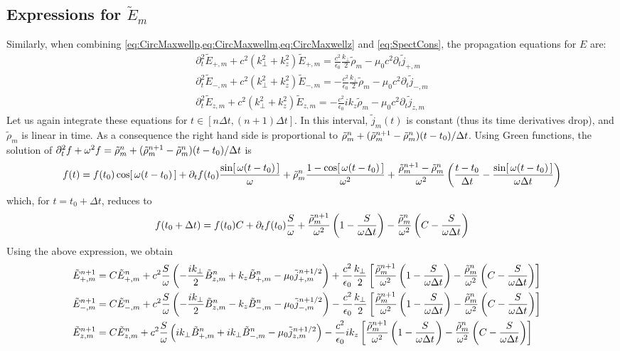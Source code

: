 \subsection{Expressions for $\tilde{E}_m$}

Similarly, when combining \cref{eq:CircMaxwellp,eq:CircMaxwellm,eq:CircMaxwellz}
and \cref{eq:SpectCons}, the propagation equations for $E$ are:
\begin{align*}
\partial_t^2 \tilde{E}_{+,m} + c^2(k_\perp^2 + k_z^2) \tilde{E}_{+,m}
= \frac{c^2}{\epsilon_0} \frac{k_\perp}{2} \tilde{\rho}_m -
\mu_0c^2 \partial_t\tilde{j}_{+,m} \\
\partial_t^2 \tilde{E}_{-,m} + c^2(k_\perp^2 + k_z^2) \tilde{E}_{-,m}
= - \frac{c^2}{\epsilon_0} \frac{k_\perp}{2} \tilde{\rho}_m -
\mu_0c^2 \partial_t\tilde{j}_{-,m} \\
\partial_t^2 \tilde{E}_{z,m} + c^2(k_\perp^2 + k_z^2) \tilde{E}_{z,m}
= - \frac{c^2}{\epsilon_0} i k_z \tilde{\rho}_m -
\mu_0c^2 \partial_t\tilde{j}_{z,m} 
\end{align*}
Let us again integrate these equations for $t\in [n\Delta t, (n+1)\Delta
t]$. In this interval, $\tilde{j}_m(t)$ is constant (thus its time
derivatives drop), and $\tilde{\rho}_m$ is linear in time. As a
consequence the right hand side is proportional to $\tilde{\rho}_{m}^{n} +
(\tilde{\rho}_{m}^{n+1}-\tilde{\rho}_{m}^{n})(t-t_0)/\Delta t$. Using Green functions, the solution of 
$ \partial_t^2 f + \omega^2 f = \tilde{\rho}_{m}^{n} + (\tilde{\rho}_{m}^{n+1}-\tilde{\rho}_{m}^{n})(t-t_0)/\Delta t $ is
\[ f(t) = f(t_0) \cos[\,\omega(t-t_0)\,] + \partial_tf (t_0)
\frac{\sin[\,\omega(t-t_0)\,]}{\omega} + \tilde{\rho}_{m}^{n}\frac{1-
  \cos[\,\omega(t-t_0)\,]}{\omega^2} + \frac{\tilde{\rho}_{m}^{n+1}-\tilde{\rho}_{m}^{n}}{\omega^2}\left(
  \frac{t-t_0}{\Delta t} - \frac{\sin[\,\omega(t-t_0)\,]}{\omega
    \Delta t}
\right) \]
which, for $t=t_0 +\Delta t$, reduces to
\[ f(t_0 +\Delta t) = f(t_0) C + \partial_tf (t_0)
\frac{S}{\omega} 
+ \frac{\tilde{\rho}_{m}^{n+1}}{\omega^2}\left( 1 - \frac{S}{\omega\Delta t}\right) 
- \frac{\tilde{\rho}_{m}^{n}}{\omega^2}\left( C - \frac{S}{\omega\Delta t}\right) \]
Using the above expression, we obtain
\begin{align*}
\tilde{E}_{+,m}^{n+1} = \; & C \tilde{E}_{+,m}^{n} + 
c^2\frac{S}{\omega}\left(-\frac{ik_\perp }{2} \tilde{B}_{z,m}^{n} + k_z\tilde{B}_{+,m}^{n}
- \mu_0 \tilde{j}_{+,m}^{n+1/2} \right) + \frac{c^2}{\epsilon_0}
\frac{k_\perp}{2}\left[ \frac{\tilde{\rho}_{m}^{n+1}}{\omega^2}\left(
  1 - \frac{S}{\omega\Delta t}\right) -
\frac{\tilde{\rho}_{m}^{n}}{\omega^2}\left( C -\frac{S}{\omega\Delta t}\right)\right]  & \\
\tilde{E}_{-,m}^{n+1} =\; & C \tilde{E}_{-,m}^{n} +
c^2\frac{S}{\omega}\left(- \frac{ik_\perp }{2} \tilde{B}_{z,m}^{n} - k_z\tilde{B}_{-,m}^{n}
- \mu_0 \tilde{j}_{-,m}^{n+1/2} \right) - \frac{c^2}{\epsilon_0}
\frac{k_\perp}{2}\left[ \frac{\tilde{\rho}_{m}^{n+1}}{\omega^2}\left(
  1 - \frac{S}{\omega\Delta t}\right) - \frac{\tilde{\rho}_{m}^{n}}{\omega^2}
\left( C - \frac{S}{\omega\Delta t}\right)\right]  &\\
\tilde{E}_{z,m}^{n+1} =\; & C \tilde{E}_{z,m}^{n} + 
c^2\frac{S}{\omega}\left(ik_\perp \tilde{B}_{+,m}^{n} + ik_\perp \tilde{B}_{-,m}^{n}
- \mu_0 \tilde{j}_{z,m}^{n+1/2} \right) - \frac{c^2}{\epsilon_0}
ik_z\left[ \frac{\tilde{\rho}_{m}^{n+1}}{\omega^2}\left(
  1 - \frac{S}{\omega\Delta t}\right) - \frac{\tilde{\rho}_{m}^{n}}{\omega^2}
\left( C - \frac{S}{\omega\Delta t}\right)\right]  &
\end{align*}


